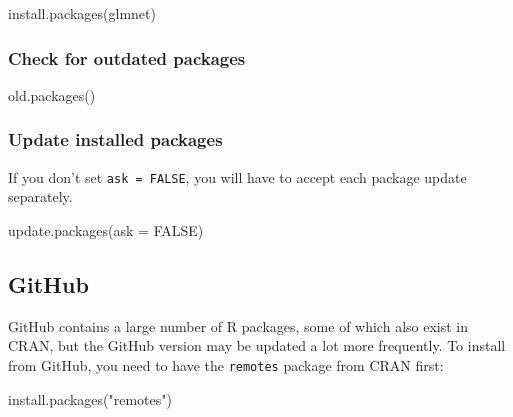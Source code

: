 \documentclass[
]{book}
\newenvironment{Shaded}{\begin{snugshade}}{\end{snugshade}}
\newcommand{\AttributeTok}[1]{\textcolor[rgb]{0.77,0.63,0.00}{#1}}
\newcommand{\ConstantTok}[1]{\textcolor[rgb]{0.00,0.00,0.00}{#1}}
\newcommand{\FunctionTok}[1]{\textcolor[rgb]{0.00,0.00,0.00}{#1}}
\newcommand{\NormalTok}[1]{#1}
\newcommand{\StringTok}[1]{\textcolor[rgb]{0.31,0.60,0.02}{#1}}
\begin{document}
\begin{Shaded}
\begin{Highlighting}[]
\FunctionTok{install.packages}\NormalTok{(}\StringTok{\textquotesingle{}glmnet\textquotesingle{}}\NormalTok{)}
\end{Highlighting}
\end{Shaded}

\hypertarget{check-for-outdated-packages}{%
\subsubsection{Check for outdated packages}\label{check-for-outdated-packages}}

\begin{Shaded}
\begin{Highlighting}[]
\FunctionTok{old.packages}\NormalTok{()}
\end{Highlighting}
\end{Shaded}

\hypertarget{update-installed-packages}{%
\subsubsection{Update installed packages}\label{update-installed-packages}}

If you don't set \texttt{ask\ =\ FALSE}, you will have to accept each package update separately.

\begin{Shaded}
\begin{Highlighting}[]
\FunctionTok{update.packages}\NormalTok{(}\AttributeTok{ask =} \ConstantTok{FALSE}\NormalTok{)}
\end{Highlighting}
\end{Shaded}

\hypertarget{github}{%
\subsection{GitHub}\label{github}}

GitHub contains a large number of R packages, some of which also exist in CRAN, but the GitHub version may be updated a lot more frequently. To install from GitHub, you need to have the \texttt{remotes} package from CRAN first:

\begin{Shaded}
\begin{Highlighting}[]
\FunctionTok{install.packages}\NormalTok{(}\StringTok{"remotes"}\NormalTok{)}
\end{Highlighting}
\end{Shaded}
\end{document}
